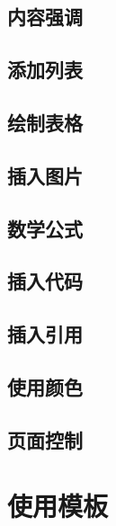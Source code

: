 \documentclass{ctexart}
\begin{document}
	\subsection{内容强调}
	\subsection{添加列表}
	\subsection{绘制表格}
	\subsection{插入图片}
	\subsection{数学公式}
	\subsection{插入代码}
	\subsection{插入引用}
	\subsection{使用颜色}
	\subsection{页面控制}
	
	\section{使用模板}
	
	
	
\end{document}
